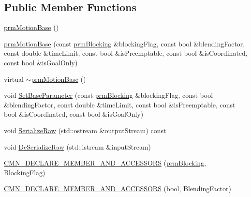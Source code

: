 \subsection*{Public Member Functions}
\begin{DoxyCompactItemize}
\item 
\hyperlink{classprm_motion_base_acde671630db715f3bbb57eb7aef0d63a}{prm\+Motion\+Base} ()
\item 
\hyperlink{classprm_motion_base_a266b99c3dcd37bf69b7e51a38694e5dd}{prm\+Motion\+Base} (const \hyperlink{prm_forward_declarations_8h_aef1d8aa0eac2eaf31e9a97334a725d8f}{prm\+Blocking} \&blocking\+Flag, const bool \&blending\+Factor, const double \&time\+Limit, const bool \&is\+Preemptable, const bool \&is\+Coordinated, const bool \&is\+Goal\+Only)
\item 
virtual \hyperlink{classprm_motion_base_a36fcb1e4bbecb67bb513093c0e3761f9}{$\sim$prm\+Motion\+Base} ()
\item 
void \hyperlink{classprm_motion_base_a9a8d6f1ddfab22529c604421fcca63a4}{Set\+Base\+Parameter} (const \hyperlink{prm_forward_declarations_8h_aef1d8aa0eac2eaf31e9a97334a725d8f}{prm\+Blocking} \&blocking\+Flag, const bool \&blending\+Factor, const double \&time\+Limit, const bool \&is\+Preemptable, const bool \&is\+Coordinated, const bool \&is\+Goal\+Only)
\item 
void \hyperlink{classprm_motion_base_a6d3429f196533973be97119c95b12a7c}{Serialize\+Raw} (std\+::ostream \&output\+Stream) const 
\item 
void \hyperlink{classprm_motion_base_ae7d6c7a2092cf287552067509bfe1339}{De\+Serialize\+Raw} (std\+::istream \&input\+Stream)
\end{DoxyCompactItemize}
{\bf }\par
\begin{DoxyCompactItemize}
\item 
\hyperlink{classprm_motion_base_a18eccebaf0719eec31196d87f14d6fc8}{C\+M\+N\+\_\+\+D\+E\+C\+L\+A\+R\+E\+\_\+\+M\+E\+M\+B\+E\+R\+\_\+\+A\+N\+D\+\_\+\+A\+C\+C\+E\+S\+S\+O\+R\+S} (\hyperlink{prm_forward_declarations_8h_aef1d8aa0eac2eaf31e9a97334a725d8f}{prm\+Blocking}, Blocking\+Flag)
\end{DoxyCompactItemize}

{\bf }\par
\begin{DoxyCompactItemize}
\item 
\hyperlink{classprm_motion_base_ae70237b7dd3fe713f97b0582af47ce4c}{C\+M\+N\+\_\+\+D\+E\+C\+L\+A\+R\+E\+\_\+\+M\+E\+M\+B\+E\+R\+\_\+\+A\+N\+D\+\_\+\+A\+C\+C\+E\+S\+S\+O\+R\+S} (bool, Blending\+Factor)
\end{DoxyCompactItemize}

